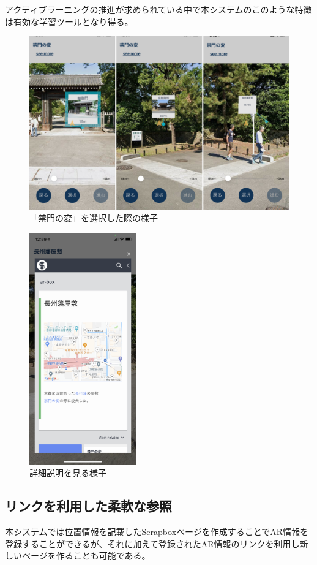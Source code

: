 アクティブラーニングの推進が求められている中で本システムのこのような特徴は有効な学習ツールとなり得る。


\begin{figure}[h]
  \centering
  \includegraphics[width=120mm]{images/ar_kinmon.png}
  \caption{「禁門の変」を選択した際の様子} \label{fig:ar_kinmon}
\end{figure}

\begin{figure}[h]
  \centering
  \includegraphics[height=100mm]{images/ar_yashiki.png}
  \caption{詳細説明を見る様子} \label{fig:ar_yashiki}
\end{figure}

\subsection{リンクを利用した柔軟な参照}
\label{link_enum_notation}
本システムでは位置情報を記載したScrapboxページを作成することでAR情報を登録することができるが、それに加えて登録されたAR情報のリンクを利用し新しいページを作ることも可能である。

